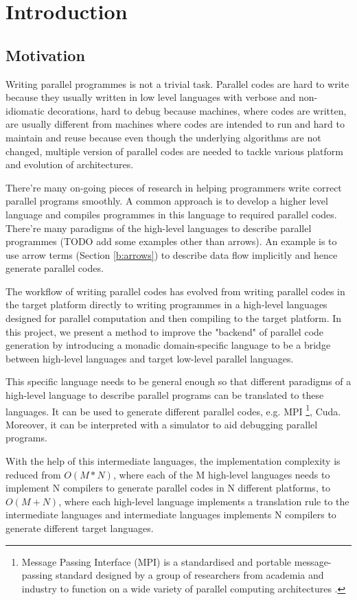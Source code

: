 \chapter{Introduction}
\section{Motivation} \label{i:m}
Writing parallel programmes is not a trivial task. Parallel codes are hard to write because they usually written in low level languages with verbose and non-idiomatic decorations, hard to debug because machines, where codes are written, are usually different from machines where codes are intended to run and hard to maintain and reuse because even though the underlying algorithms are not changed, multiple version of parallel codes are needed to tackle various platform and evolution of architectures.

There're many on-going pieces of research in helping programmers write correct parallel programs smoothly. A common approach is to develop a higher level language and compiles programmes in this language to required parallel codes. There're many paradigms of the high-level languages to describe parallel programmes (TODO add some examples other than arrows). An example is to use arrow terms (Section \ref{b:arrows}) to describe data flow implicitly and hence generate parallel codes.

The workflow of writing parallel codes has evolved from writing parallel codes in the target platform directly to writing programmes in a high-level languages designed for parallel computation and then compiling to the target platform. In this project, we present a method to improve the "backend" of parallel code generation by introducing a monadic domain-specific language to be a bridge between high-level languages and target low-level parallel languages.

This specific language needs to be general enough so that different paradigms of a high-level language to describe parallel programs can be translated to these languages. It can be used to generate different parallel codes, e.g. MPI \footnote{Message Passing Interface (MPI) is a standardised and portable message-passing standard designed by a group of researchers from academia and industry to function on a wide variety of parallel computing architectures \cite{MessagePassingInterface2018}.}, Cuda. Moreover, it can be interpreted with a simulator to aid debugging parallel programs.

With the help of this intermediate languages, the implementation complexity is reduced from $O(M * N)$, where each of the M high-level languages needs to implement N compilers to generate parallel codes in N different platforms, to $O(M + N)$, where each high-level language implements a translation rule to the intermediate languages and intermediate languages implements N compilers to generate different target languages.

